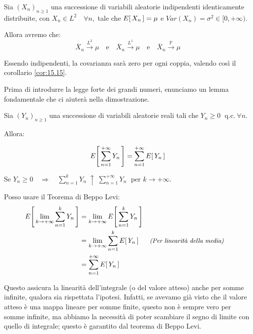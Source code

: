 \begin{corollario}
\label{cor:15.16}
    Sia $(X_n)_{n\geq1}$ una successione di variabili aleatorie indipendenti identicamente distribuite, con $X_n\in L^2\quad \forall n, $ tale che $E\!\left[\,X_n\,\right] = \mu$ e $Var(X_n) = \sigma^2 \in [0, +\infty)$.

    \medskip Allora avremo che:
    \[\overline{X}_n \overset{L^2}{\longrightarrow}\mu \quad \text{e}\quad \overline{X}_n \overset{L^1}{\longrightarrow}\mu\quad \text{e}\quad \overline{X}_n \overset{\mathbb{P}}{\longrightarrow}\mu \]
    \begin{dimostrazione}
        Essendo indipendenti, la covarianza sarà zero per ogni coppia, valendo così il corollario \ref{cor:15.15}.
    \end{dimostrazione}
\end{corollario}

\bigskip \noindent Prima di introdurre la legge forte dei grandi numeri, enunciamo un lemma fondamentale che ci aiuterà nella dimostrazione.
\begin{lemma}
\label{lemma:15.17}
    Sia $(Y_n)_{n\geq1}$ una successione di variabili aleatorie reali tali che $Y_n\geq 0\;$ q.c.$\:\forall n$. 

    \medskip \noindent Allora:

    \[E\!\left[\,\sum_{n = 1}^{+\infty} Y_n\,\right] = \sum_{n = 1}^{+\infty}E\!\left[\,Y_n\,\right]\]

    \begin{dimostrazione}
        Se $Y_n\geq 0 \quad \Rightarrow\quad \sum_{n = 1}^k Y_n \;\uparrow\;\sum_{n = 1}^{+\infty} Y_n\;$ per $k\to+\infty$.

        \medskip \noindent Posso usare il Teorema di Beppo Levi:
        \begin{align*}
            E\!\left[\,\lim_{k\to+\infty}\sum_{n = 1}^{k}Y_n\,\right] & = \lim_{k\to+\infty} E\!\left[\,\sum_{n = 1}^{k} Y_n\,\right] \\
            & = \lim_{k\to+\infty} \sum_{n = 1}^{k} E\!\left[\,Y_n\,\right] &&\textit{\small(Per linearità della media)}\\
            & = \sum_{n = 1}^{+\infty} E\!\left[\,Y_n\,\right]
        \end{align*}
    \end{dimostrazione}
\end{lemma}

Questo assicura la linearità dell'integrale (o del valore atteso) anche per somme infinite, qualora sia rispettata l'ipotesi. Infatti, se avevamo già visto che il valore atteso è una mappa lineare per somme finite, questo non è sempre vero per somme infinite, ma abbiamo la necessità di poter scambiare il segno di limite con quello di integrale; questo è garantito dal teorema di Beppo Levi.

